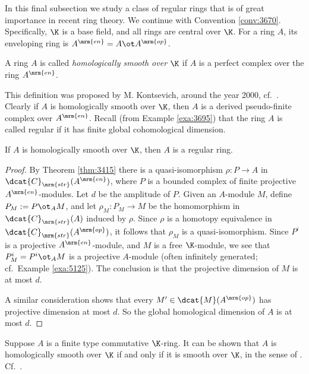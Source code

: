\label{subsec:tw-CY}

In this final subsection we study a class of regular rings that is of great 
importance in recent ring theory. 
We continue with Convention \ref{conv:3670}.
Specifically, $\K$ is a base field, and all rings are central over $\K$. 
For a ring $A$, its enveloping ring is 
$A^{\mrm{en}} = A \ot A^{\mrm{op}}$. 

\begin{dfn} \label{dfn:4860}
A ring $A$ is called {\em homologically smooth over $\K$} if $A$ is a perfect 
complex over the ring $A^{\mrm{en}}$.
\end{dfn}

This definition was proposed by M. Kontsevich, around the year 2000, cf.\ 
\cite[Erratum]{VdB2}.
Clearly if $A$ is homologically smooth over $\K$, then $A$ is a derived 
pseudo-finite complex over $A^{\mrm{en}}$. 
Recall (from Example \ref{exa:3695}) that the ring $A$ is called regular if it 
has finite global cohomological dimension. 

\begin{prop} \label{prop:4860}
If $A$ is homologically smooth over $\K$, then $A$ is a regular ring. 
\end{prop}

\begin{proof}
By Theorem \ref{thm:3415} there is a quasi-isomorphism 
$\rho : P \to A$ in $\dcat{C}_{\mrm{str}}(A^{\mrm{en}})$, where $P$ 
is a bounded complex of finite projective $A^{\mrm{en}}$-modules. 
Let $d$ be the amplitude of $P$. 
Given an $A$-module $M$, define $P_M := P \ot_A M$, and let 
$\rho_M : P_M \to M$ be the homomorphism in
$\dcat{C}_{\mrm{str}}(A)$ induced by $\rho$. Since $\rho$ is a homotopy 
equivalence in $\dcat{C}_{\mrm{str}}(A^{\mrm{op}})$, it follows that $\rho_M$ is 
a quasi-isomorphism. Since $P^i$ is a projective $A^{\mrm{en}}$-module, 
and $M$ is a free $\K$-module, we see that $P_M^i = P^i \ot_A M$ is a 
projective $A$-module (often infinitely generated; cf.\ Example \ref{exa:5125}). 
The conclusion is that the 
projective dimension of $M$ is at most $d$. 

A similar consideration shows that every $M' \in \dcat{M}(A^{\mrm{op}})$
has projective dimension at most $d$. So the global homological 
dimension of $A$ is at most $d$. 
\end{proof}

\begin{rem} \label{rem:4860}
Suppose $A$ is a finite type commutative $\K$-ring. It can be shown that $A$ is 
homologically smooth over $\K$ if and only if it is smooth over $\K$, in the 
sense of \cite{EGA-IV}. Cf.\ \cite[Proposition 3.24]{Mil}.
\end{rem}

